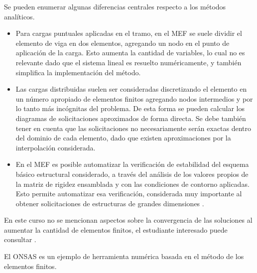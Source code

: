 Se pueden enumerar algunas diferencias centrales respecto a los métodos analíticos.
%
\begin{itemize}
	\item Para cargas puntuales aplicadas en el tramo, en el MEF se suele dividir el elemento de viga en dos elementos, agregando un nodo en el punto de aplicación de la carga. Esto aumenta la cantidad de variables, lo cual no es relevante dado que el sistema lineal es resuelto numéricamente, y también simplifica la implementación del método.
	\item Las cargas distribuidas suelen ser consideradas discretizando el elemento en un número apropiado de elementos finitos agregando nodos intermedios y por lo tanto más incógnitas del problema. De esta forma se pueden calcular los diagramas de solicitaciones aproximados de forma directa. %
	Se debe también tener en cuenta que las solicitaciones no necesariamente serán exactas dentro del dominio de cada elemento, dado que existen aproximaciones por la interpolación considerada.
	\item En el MEF es posible automatizar la verificación de estabilidad del esquema básico estructural considerado, a través del análisis de los valores propios de la matriz de rigidez ensamblada y con las condiciones de contorno aplicadas. %
	Esto permite automatizar esa verificación, considerada muy importante al obtener solicitaciones de estructuras de grandes dimensiones \citep{Kannan2014}. 
\end{itemize}

En este curso no se mencionan aspectos sobre la convergencia de las soluciones al aumentar la cantidad de elementos finitos, el estudiante interesado puede consultar \citep{Hughes1987a}.

El ONSAS es un ejemplo de herramienta numérica basada en el método de los elementos finitos.

%
%
%
%








